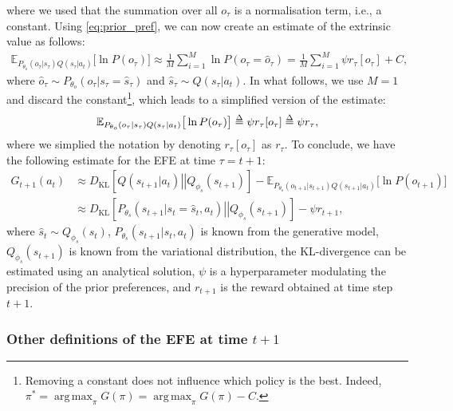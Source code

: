 \documentclass[twoside,11pt]{article}
\newcommand{\kl}[2]{D_{\mathrm{KL}} \left[ \left. \left. #1 \right|\right| #2 \right] }
\DeclareMathOperator*{\argmax}{arg\,max}
\def\delequal{\mathrel{\ensurestackMath{\stackon[1pt]{=}{\scriptstyle\Delta}}}}
\begin{document}
where we used that the summation over all $o_\tau$ is a normalisation term, i.e., a constant. Using \eqref{eq:prior_pref}, we can now create an estimate of the extrinsic value as follows:
\begin{align*}
\mathbb{E}_{P_{\theta_o}(o_\tau|s_\tau)Q(s_\tau | a_t)}\big[\ln P(o_\tau)\big] \approx \frac{1}{M} \sum_{i = 1}^M \ln P(o_\tau = \hat{o}_\tau) = \frac{1}{M} \sum_{i = 1}^M \psi r_\tau[o_\tau] + C,
\end{align*}
where $\hat{o}_\tau \sim P_{\theta_o}(o_\tau|s_\tau=\hat{s}_\tau)$ and $\hat{s}_\tau \sim Q(s_\tau | a_t)$. In what follows, we use $M=1$ and discard the constant\footnote{Removing a constant does not influence which policy is the best. Indeed, $\pi^* = \argmax_\pi G(\pi) = \argmax_\pi G(\pi) - C$.}, which leads to a simplified version of the estimate:
\begin{align*}
\mathbb{E}_{P_{\theta_o}(o_\tau|s_\tau)Q(s_\tau | a_t)}\big[\ln P(o_\tau)\big] \delequal \psi r_\tau[o_\tau] \delequal \psi r_\tau,
\end{align*}
where we simplied the notation by denoting $r_\tau[o_\tau]$ as $r_\tau$. To conclude, we have the following estimate for the EFE at time $\tau = t+1$:
\begin{align}
G_{t+1}(a_t) &\approx \kl{Q(s_{t+1} | a_t)}{Q_{\phi_s}(s_{t+1})} - \mathbb{E}_{P_{\theta_o}(o_{t+1}|s_{t+1})Q(s_{t+1} | a_t)}\big[\ln P(o_{t+1})\big]\nonumber\\
&\approx \kl{P_{\theta_s}(s_{t+1}|s_t = \hat{s}_t, a_t)}{Q_{\phi_s}(s_{t+1})} - \psi r_{t+1},
\end{align}
where $\hat{s}_t \sim Q_{\phi_s}(s_t)$, $P_{\theta_s}(s_{t+1}|s_t, a_t)$ is known from the generative model, $Q_{\phi_s}(s_{t+1})$ is known from the variational distribution, the KL-divergence can be estimated using an analytical solution, $\psi$ is a hyperparameter modulating the precision of the prior preferences, and $r_{t+1}$ is the reward obtained at time step $t+1$.

\subsubsection{Other definitions of the EFE at time $t + 1$} \label{ssec:efe_other_defe}
\end{document}
